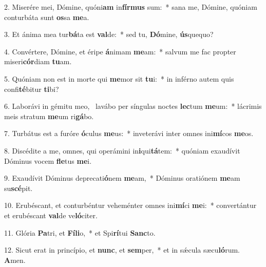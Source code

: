 2. Miserére mei, Dómine, quóni\textbf{am} in\textbf{fír}\textbf{mus} sum:~*  sana me, Dómine, quóniam conturbáta sunt \textbf{os}sa \textbf{me}a.\

3. Et ánima mea tur\textbf{bá}ta est \textbf{val}de:~*  sed tu, \textbf{Dó}mine, \textbf{ús}quequo?\

4. Convértere, Dómine, et éripe \textbf{á}nimam \textbf{me}am:~*  salvum me fac propter miseri\textbf{cór}diam \textbf{tu}am.\

5. Quóniam non est in morte qui \textbf{me}mor sit \textbf{tu}i:~*  in inférno autem quis confi\textbf{té}bitur \textbf{ti}bi?\

6. Laborávi in gémitu meo, \dag\  lavábo per síngulas noctes \textbf{lec}tum \textbf{me}um:~*  lácrimis meis stratum \textbf{me}um ri\textbf{gá}bo.\

7. Turbátus est a furóre \textbf{ó}culus \textbf{me}us:~*  inveterávi inter omnes ini\textbf{mí}cos \textbf{me}os.\

8. Discédite a me, omnes, qui operámini in\textbf{i}qui\textbf{tá}tem:~*  quóniam exaudívit Dóminus vocem \textbf{fle}tus \textbf{me}i.\

9. Exaudívit Dóminus deprecati\textbf{ó}nem \textbf{me}am,~*  Dóminus oratiónem \textbf{me}am su\textbf{scé}pit.\

10. Erubéscant, et conturbéntur veheménter omnes ini\textbf{mí}ci \textbf{me}i:~*  convertántur et erubéscant \textbf{val}de ve\textbf{ló}citer.\

11. Glória \textbf{Pa}tri, et \textbf{Fí}\textbf{li}o,~*  et Spi\textbf{rí}tui \textbf{Sanc}to.\

12. Sicut erat in princípio, et \textbf{nunc}, et \textbf{sem}per,~*  et in sǽcula sæcu\textbf{ló}rum. \textbf{A}men.\

